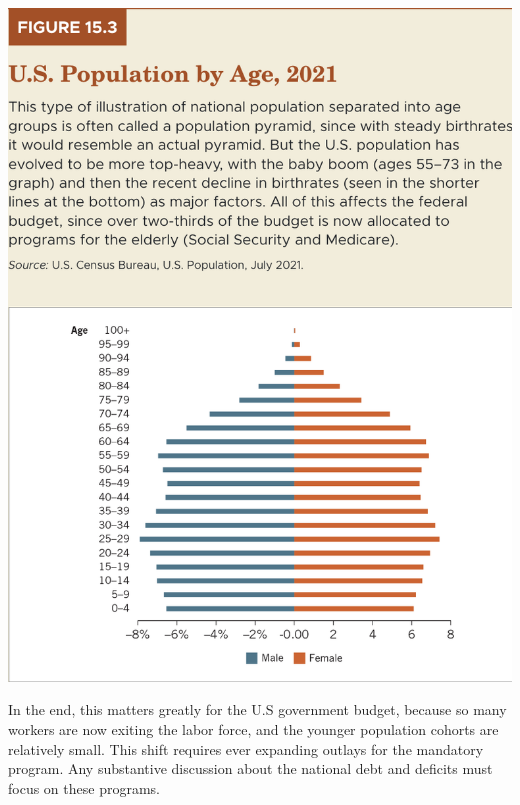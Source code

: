 \documentclass[11pt]{article} %
\begin{document}
\begin{center}
\includegraphics[scale=0.5]{images/Figure 15.3.png}
\end{center}
In the end, this matters greatly for the U.S government budget, because so many workers are now exiting the labor force, and the younger population cohorts are relatively small. This shift requires ever expanding outlays for the mandatory program. Any substantive discussion about the national debt and deficits must focus on these programs.
\end{document}

